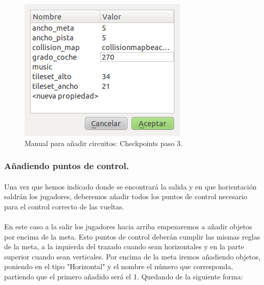 \begin{figure}[H]
  \label{checkpoints3}
  \begin{center}
    \includegraphics[scale=0.5]{imagenes/manualcircuito/checkpoints3.png}
  \end{center}
  \caption{Manual para añadir circuitos: Checkpoints paso 3.}
\end{figure}

\subsubsection{Añadiendo puntos de control.}

\paragraph{}
Una vez que hemos indicado donde se encontrará la salida y en que horientación saldrán los jugadores, deberemos añadir todos los
puntos de control necesario para el control correcto de las vueltas.

\paragraph{}
En este caso a la salir los jugadores hacia arriba empezaremos a añadir objetos por encima de la meta. Esto puntos de control
deberán cumplir las mismas reglas de la meta, a la izquierda del trazado cuando sean horizontales y en la parte superior cuando
sean verticales. Por encima de la meta iremos añadiendo objetos, poniendo en el tipo "Horizontal" y el nombre el número que 
corresponda, partiendo que el primero añadido será el 1. Quedando de la siguiente forma:

